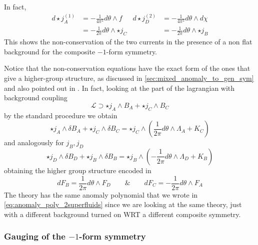 \documentclass[aps,preprint,nofootinbib,preprintnumbers,eqsecnum,superscriptaddress]{revtex4}
\numberwithin{equation}{section}
\begin{document}
In fact,
\begin{align}
d\star j^{(1)}_A &= - \frac{1}{4\pi^2} d\theta \wedge f & d \star j^{(2)}_D &= - \frac{1}{4 \pi^2} d\theta \wedge d\chi \\
&= - \frac{1}{2\pi} d\theta \wedge \star j_C & &= - \frac{1}{2\pi} d\theta \wedge \star j_B
\end{align}
This shows the non-conservation of the two currents in the presence of a non flat background for the composite $-1$-form symmetry.

Notice that the non-conservation equations have the exact form of the ones that give a higher-group structure, as discussed in \ref{sec:mixed_anomaly_to_gen_sym} and also pointed out in \cite{Brauner_2021}. In fact, looking at the part of the lagrangian with background coupling
\begin{equation}
    \mathcal{L} \supset \star j_A \wedge B_A + \star j_C \wedge B_C
\end{equation}
by the standard procedure we obtain
\begin{equation}
    \star j_A \wedge \delta B_A + \star j_C \wedge \delta B_C = \star j_C \wedge ( \frac{1}{2\pi} d\theta \wedge \Lambda_A + K_C ) 
\end{equation}
and analogously for $j_B, j_D$
\begin{equation}
    \star j_D \wedge \delta B_D + \star j_B \wedge \delta B_B = \star j_B \wedge ( -\frac{1}{2\pi} d\theta \wedge \Lambda_D + K_B ) 
\end{equation}
obtaining the higher group structure encoded in
\begin{equation}
    dF_B = \frac{1}{2\pi} d\theta \wedge F_D \qquad \& \qquad dF_C = -\frac{1}{2\pi} d\theta \wedge F_A
\end{equation}
The theory has the same anomaly polynomial that we wrote in \ref{eq:anomaly_poly_2superfluids} since we are looking at the same theory, just with a different background turned on WRT a different composite symmetry.

\subsubsection{Gauging of the $-1$-form symmetry}
\label{sec:superfluid_01_composite}
\end{document}
